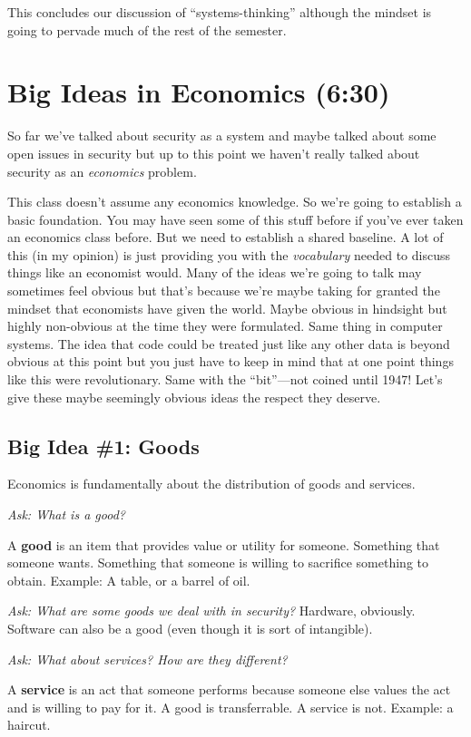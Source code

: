 \documentclass[11pt]{article}
\begin{document}
This concludes our discussion of ``systems-thinking'' although the mindset is going to pervade much of the rest of the semester.

\section{Big Ideas in Economics (6:30)}

So far we've talked about security as a system and maybe talked about some open issues in security but up to this point we haven't really talked about security as an {\it economics} problem.

This class doesn't assume any economics knowledge. So we're going to establish a basic foundation.
You may have seen some of this stuff before if you've ever taken an economics class before.
But we need to establish a shared baseline. A lot of this (in my opinion) is just providing you with the {\it vocabulary} needed to discuss things like an economist would. Many of the ideas we're going to talk may sometimes feel obvious but that's because we're maybe taking for granted the mindset that economists have given the world. Maybe obvious in hindsight but highly non-obvious at the time they were formulated. Same thing in computer systems. The idea that code could be treated just like any other data is beyond obvious at this point but you just have to keep in mind that at one point things like this were revolutionary. Same with the ``bit''---not coined until 1947! Let's give these maybe seemingly obvious ideas the respect they deserve.


\subsection{Big Idea \#1: Goods}

Economics is fundamentally about the distribution of goods and services. 

{\it Ask: What is a good?}

A {\bf good} is an item that provides value or utility for someone. Something that someone wants. Something that someone is willing to sacrifice something to obtain. Example: A table, or a barrel of oil.

{\it Ask: What are some goods we deal with in security?} Hardware, obviously. Software can also be a good (even though it is sort of intangible).

{\it Ask: What about services? How are they different?}

A {\bf service} is an act that someone performs because someone else values the act and is willing to pay for it. 
A good is transferrable. A service is not. 
Example: a haircut.
\end{document}
